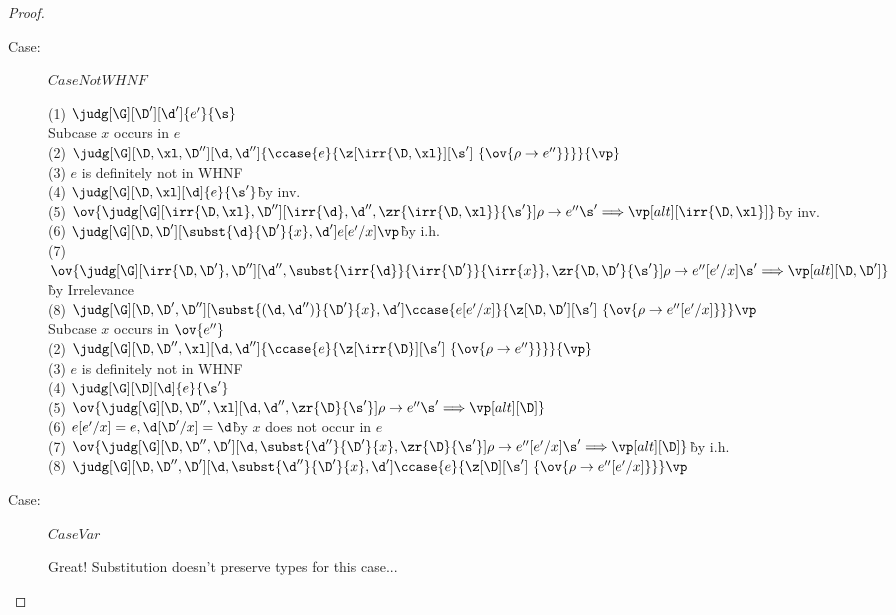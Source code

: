 \begin{proof}
\begin{description}
\item[Case:] $CaseNotWHNF$
\begin{tabbing}
  (1) $\judg[\G][\D'][\d']{e'}{\s}$\\
  Subcase $x$ occurs in $e$\\
    (2) $\judg[\G][\D,\xl,\D''][\d,\d'']{\ccase{e}{\z[\irr{\D,\xl}][\s']~\{\ov{\rho\to e''}\}}}{\vp}$\\
    (3) $e$ is definitely not in WHNF\\
    (4) $\judg[\G][\D,\xl][\d]{e}{\s'}$\`by inv.\\
    (5) $\ov{\judg[\G][\irr{\D,\xl},\D''][\irr{\d},\d'',\zr{\irr{\D,\xl}}{\s'}]{\rho\to e''}{\s' \Longrightarrow \vp}[alt][\irr{\D,\xl}]}$\`by inv.\\
    (6) $\judg[\G][\D,\D'][\subst{\d}{\D'}{x}, \d']{e[e'/x]}{\vp}$\`by i.h.\\
    (7) $\ov{\judg[\G][\irr{\D,\D'},\D''][\d'',\subst{\irr{\d}}{\irr{\D'}}{\irr{x}},\zr{\D,\D'}{\s'}]{\rho\to e''[e'/x]}{\s' \Longrightarrow \vp}[alt][\D,\D']}$\\
    \` by Irrelevance\\
    (8) $\judg[\G][\D,\D',\D''][\subst{(\d,\d'')}{\D'}{x},\d']{\ccase{e[e'/x]}{\z[\D,\D'][\s']~\{\ov{\rho\to e''[e'/x]}\}}}{\vp}$\\
  Subcase $x$ occurs in $\ov{e''}$\\
    (2) $\judg[\G][\D,\D'',\xl][\d,\d'']{\ccase{e}{\z[\irr{\D}][\s']~\{\ov{\rho\to e''}\}}}{\vp}$\\
    (3) $e$ is definitely not in WHNF\\
    (4) $\judg[\G][\D][\d]{e}{\s'}$\\
    (5) $\ov{\judg[\G][\D,\D'',\xl][\d,\d'',\zr{\D}{\s'}]{\rho\to e''}{\s' \Longrightarrow \vp}[alt][\D]}$\\
    (6) $e[e'/x] = e, \d[\D'/x]=\d$\` by $x$ does not occur in $e$\\
    (7) $\ov{\judg[\G][\D,\D'',\D'][\d,\subst{\d''}{\D'}{x},\zr{\D}{\s'}]{\rho\to e''[e'/x]}{\s' \Longrightarrow \vp}[alt][\D]}$\`by i.h.\\
    (8) $\judg[\G][\D,\D'',\D'][\d,\subst{\d''}{\D'}{x},\d']{\ccase{e}{\z[\D][\s']~\{\ov{\rho\to e''[e'/x]}\}}}{\vp}$\\
\end{tabbing}

\item[Case:] $CaseVar$
\begin{tabbing}
    Great! Substitution doesn't preserve types for this case...
\end{tabbing}


\end{description}
\end{proof}

